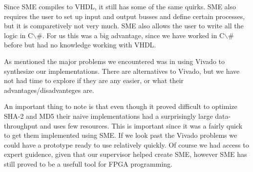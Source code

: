 \documentclass[a4paper, openany]{book}
\begin{document}
\begin{abstact}
Since SME compiles to VHDL, it still has some of the same quirks. SME also requires the user to set up input and output busses and define certain processes,
but it is comparetively not very much. SME also allows the user to write all the logic in C$\backslash$#.
For us this was a big advantage, since we have worked in C$\backslash$# before but had no knowledge working with VHDL.

As mentioned the major problems we encountered was in using Vivado to synthesize our implementations.
There are alternatives to Vivado, but we have not had time to explore if they are any easier, or what their advantages/disadvanteges are.

An important thing to note is that even though it proved difficult to optimize SHA-2 and MD5 their naive implementations had a
surprisingly large data-throughput and uses few resources. This is important since it was a fairly quick to get them implemented using SME.
If we look past the Vivado problems we could have a prototype ready to use relatively quickly.
Of course we had access to expert guidence, given that our supervisor helped create SME, however SME has still proved to be a usefull tool for FPGA programming.

\end{abstact}
\end{document}

